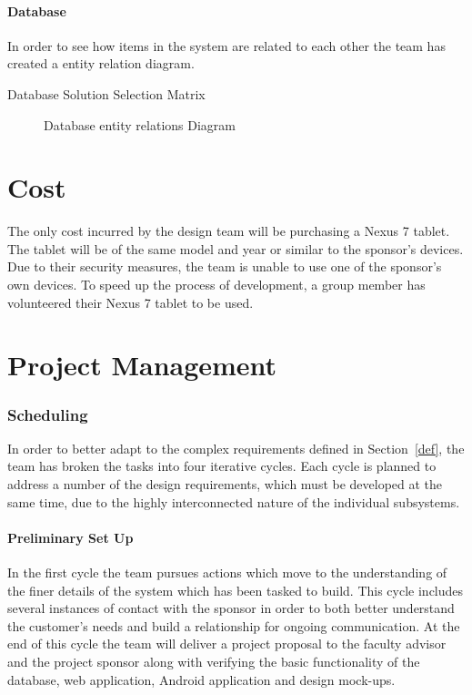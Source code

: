 \documentclass[Letter,11pt]{article}
\begin{document}
	
	\subsection{Database}
		In order to see how items in the system are related to each other the team has created a entity relation diagram.
		\begin{table}[h]
			\centering
			
			\caption{\label{DBMatrix} Database Solution Selection Matrix}
		\end{table}
		
		\begin{figure}[h]
			\centering
			
			\caption{\label{ERdiogram} Database entity relations Diagram}
		\end{figure}
	

		
	
\part{Cost}
The only cost incurred by the design team will be purchasing a Nexus 7 tablet. The tablet will be of the same model and year or similar to the sponsor's devices.  Due to their security measures, the team is unable to use one of the sponsor's own devices. To speed up the process of development, a group member has volunteered their Nexus 7 tablet to be used.
\part{Project Management}
\section{Scheduling}
		In order to better adapt to the complex requirements defined in Section~\ref{def}, the team has broken the tasks into four iterative cycles. Each cycle is planned to address a number of the design requirements, which must be developed at the same time, due to the highly interconnected nature of the individual subsystems. 
		
		
	\subsection{Preliminary Set Up}\label{cyc1}
		In the first cycle the team pursues actions which move to the understanding of the finer details of the system which has been tasked to build. This cycle includes several instances of contact with the sponsor in order to both better understand the customer's needs and build a relationship for ongoing communication. At the end of this cycle the team will deliver a project proposal to the faculty advisor and the project sponsor along with verifying the basic functionality of the database, web application, Android application and design mock-ups. 
		
\end{document}
